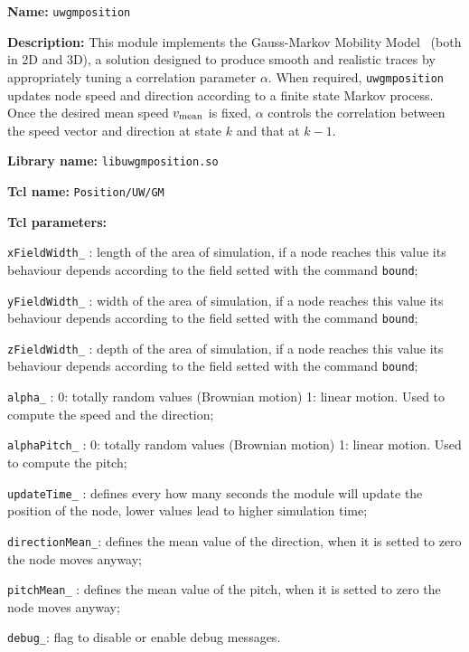 \vspace{1 cm}

\begin{description}
   \item {\bf Name:} {\tt uwgmposition}
   \item {\bf Description:} This module implements the Gauss-Markov Mobility Model~\cite{LiangNY} (both in 2D and 3D), a solution designed to produce smooth and realistic traces by appropriately tuning a correlation parameter $\alpha$. When required, {\tt uwgmposition} updates node speed and direction according to a finite state Markov process. Once the desired mean speed $v_{\operatorname*{mean}}$ is fixed, $\alpha$ controls the correlation between the speed vector and direction at state $k$ and that at $k-1$.
   \item {\bf Library name:} {\tt libuwgmposition.so} 
   \item {\bf Tcl name:} {\tt Position/UW/GM}
   \item {\bf Tcl parameters:}
   \begin{description}
    \item {\tt xFieldWidth\_} : length of the area of simulation, if a node reaches this value its behaviour depends according to the field setted with the command {\tt bound};
    \item {\tt yFieldWidth\_} : width of the area of simulation, if a node reaches this value its behaviour depends according to the field setted with the command {\tt bound};
    \item {\tt zFieldWidth\_} : depth of the area of simulation, if a node reaches this value its behaviour depends according to the field setted with the command {\tt bound};
    \item {\tt alpha\_} : 0: totally random values (Brownian motion) 1: linear motion. Used to compute the speed and the direction;
    \item {\tt alphaPitch\_} : 0: totally random values (Brownian motion) 1: linear motion. Used to compute the pitch;
    \item {\tt updateTime\_} : defines every how many seconds the module will update the position of the node, lower values lead to higher simulation time;
    \item {\tt directionMean\_}: defines the mean value of the direction, when it is setted to zero the node moves anyway;
    \item {\tt pitchMean\_} : defines the mean value of the pitch, when it is setted to zero the node moves anyway;
    \item {\tt debug\_}: flag to disable or enable debug messages.

\end{description}
\end{description}
